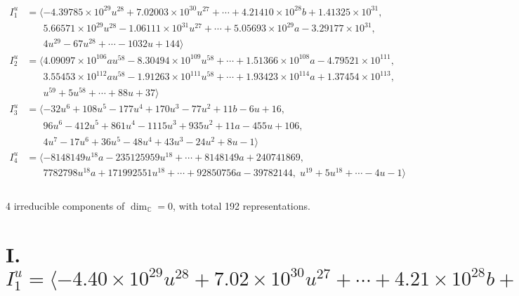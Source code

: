 \documentclass[1p]{elsarticle_modified}
\theoremstyle{definition}
\begin{document}
\begin{align*}
I^u_{1}&=\langle 
-4.39785\times10^{29} u^{28}+7.02003\times10^{30} u^{27}+\cdots+4.21410\times10^{28} b+1.41325\times10^{31},\\
\phantom{I^u_{1}}&\phantom{= \langle  }5.66571\times10^{29} u^{28}-1.06111\times10^{31} u^{27}+\cdots+5.05693\times10^{29} a-3.29177\times10^{31},\\
\phantom{I^u_{1}}&\phantom{= \langle  }4 u^{29}-67 u^{28}+\cdots-1032 u+144\rangle \\
I^u_{2}&=\langle 
4.09097\times10^{106} a u^{58}-8.30494\times10^{109} u^{58}+\cdots+1.51366\times10^{108} a-4.79521\times10^{111},\\
\phantom{I^u_{2}}&\phantom{= \langle  }3.55453\times10^{112} a u^{58}-1.91263\times10^{111} u^{58}+\cdots+1.93423\times10^{114} a+1.37454\times10^{113},\\
\phantom{I^u_{2}}&\phantom{= \langle  }u^{59}+5 u^{58}+\cdots+88 u+37\rangle \\
I^u_{3}&=\langle 
-32 u^6+108 u^5-177 u^4+170 u^3-77 u^2+11 b-6 u+16,\\
\phantom{I^u_{3}}&\phantom{= \langle  }96 u^6-412 u^5+861 u^4-1115 u^3+935 u^2+11 a-455 u+106,\\
\phantom{I^u_{3}}&\phantom{= \langle  }4 u^7-17 u^6+36 u^5-48 u^4+43 u^3-24 u^2+8 u-1\rangle \\
I^u_{4}&=\langle 
-8148149 u^{18} a-235125959 u^{18}+\cdots+8148149 a+240741869,\\
\phantom{I^u_{4}}&\phantom{= \langle  }7782798 u^{18} a+171992551 u^{18}+\cdots+92850756 a-39782144,\;u^{19}+5 u^{18}+\cdots-4 u-1\rangle \\
\\
\end{align*}
\raggedright * 4 irreducible components of $\dim_{\mathbb{C}}=0$, with total 192 representations.\\
\newpage
\renewcommand{\arraystretch}{1}
\centering \section*{I. $I^u_{1}= \langle -4.40\times10^{29} u^{28}+7.02\times10^{30} u^{27}+\cdots+4.21\times10^{28} b+1.41\times10^{31},\;5.67\times10^{29} u^{28}-1.06\times10^{31} u^{27}+\cdots+5.06\times10^{29} a-3.29\times10^{31},\;4 u^{29}-67 u^{28}+\cdots-1032 u+144 \rangle$}
\end{document}
